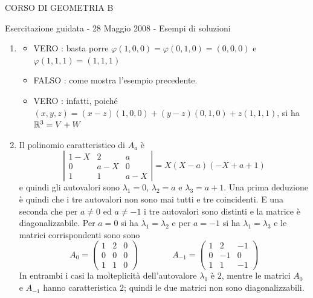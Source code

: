 \begin{enumerate}
\end{enumerate}

\newpage

\centerline {\Large CORSO DI GEOMETRIA B}

\bigskip

\centerline {\large Esercitazione guidata - 28 Maggio 2008 - Esempi di soluzioni}

\begin{enumerate}

\bigskip

\item
\begin{itemize}
\item[a)] VERO : basta porre $\varphi (1,0,0) = \varphi (0,1,0) = (0,0,0)$ e $\varphi (1,1,1) = (1,1,1)$ 
\item[b)] FALSO : come mostra l'esempio precedente.
\item[c)] VERO : infatti, poich\'{e} $(x,y,z) = (x - z)(1,0,0) + (y - z)(0,1,0) + z(1,1,1)$, si ha ${\Bbb{R}}^{3} = V + W$
\end{itemize}

\item
Il polinomio caratteristico di $A_{a}$ \`{e}
$$\left | \begin{array}{ccc} 1 - X & 2 & a \\ 0 & a - X & 0 \\ 1 & 1 & a - X \end{array} \right | = X(X - a)(-X + a + 1)$$
e quindi gli autovalori sono $\lambda_{1} = 0$, $\lambda_{2} = a$ e $\lambda_{3} = a + 1$. \newline
Una prima deduzione \`{e} quindi che i tre autovalori non sono mai tutti e tre coincidenti. \newline
E una seconda che per $a \neq 0$ ed $a \neq -1$ i tre autovalori sono distinti e la matrice \`{e} diagonalizzabile. \newline
Per $a = 0$ si ha $\lambda_{1} = \lambda_{2}$ e per $a = -1$ si ha $\lambda_{1} = \lambda_{3}$ e le matrici corrispondenti sono sono
$$A_{0} = \left ( \begin{array}{ccc} 1 & 2 & 0 \\ 0 & 0 & 0 \\ 1 & 1 & 0 \end{array} \right ) \qquad \qquad A_{-1} = \left ( \begin{array}{rrr} 1 & 2 & -1 \\ 0 & -1 & 0 \\ 1 & 1 & -1 \end{array} \right )$$
In entrambi i casi la molteplicit\`{a} dell'autovalore $\lambda_{1}$ \`{e} $2$, mentre le matrici $A_{0}$ e $A_{-1}$ hanno caratteristica $2$; quindi le due matrici non sono diagonalizzabili.


\end{enumerate}
